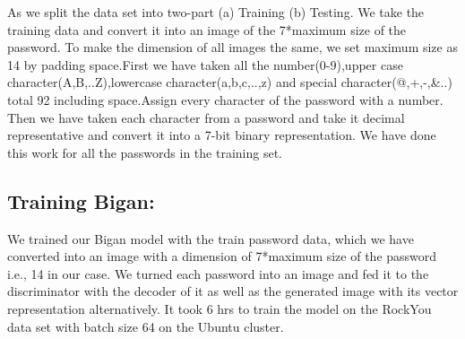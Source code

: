 \documentclass[runningheads]{llncs}
\begin{document}
{As we split the data set into two-part (a) Training (b) Testing. We take the training data and convert it into an image of the 7*maximum size of the password. To make the dimension of all images the same, we set maximum size as 14 by padding space.First we have taken all the number(0-9),upper case character(A,B,..Z),lowercase character(a,b,c,..,z) and special character(@,+,-,&..) total 92 including space.Assign every character of the password with a number. Then we have taken each character from a password and take it decimal representative and convert it into a 7-bit binary representation. We have done this work for all the passwords in the training set.

\par
\newline
\begin{table}[h]
\centering
\caption{Representing text into binary }
\label{}
\end{table}
}
\subsection{Training Bigan:}
We trained our Bigan model with the train password data, which we have converted into an image with a dimension of 7*maximum size of the password i.e., 14 in our case. We turned each password into an image and fed it to the discriminator with the decoder of it as well as the generated image with its vector representation alternatively.
It took 6 hrs to train the model on the RockYou data set with batch size 64 on the Ubuntu cluster. 
\end{document}
